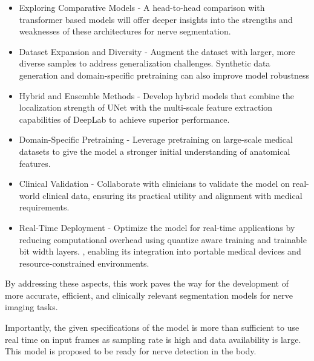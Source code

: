 \documentclass{article}
\begin{document}
\begin{itemize}
    \item Exploring Comparative Models - 
	A head-to-head comparison with transformer based models will offer deeper insights into the strengths and weaknesses of these architectures for nerve segmentation.
    \item Dataset Expansion and Diversity - Augment the dataset with larger, more diverse samples to address generalization challenges. Synthetic data generation and domain-specific pretraining can also improve model robustness
    \item Hybrid and Ensemble Methods - Develop hybrid models that combine the localization strength of UNet with the multi-scale feature extraction capabilities of DeepLab to achieve superior performance.
    \item Domain-Specific Pretraining - Leverage pretraining on large-scale medical datasets to give the model a stronger initial understanding of anatomical features.
    \item Clinical Validation - Collaborate with clinicians to validate the model on real-world clinical data, ensuring its practical utility and alignment with medical requirements.
    \item Real-Time Deployment - Optimize the model for real-time applications by reducing computational overhead using quantize aware training and trainable bit width layers. \cite{boerkamp2025quantunetefficientwearablemedical}, enabling its integration into portable medical devices and resource-constrained environments.
\end{itemize}

By addressing these aspects, this work paves the way for the development of more accurate, efficient, and clinically relevant segmentation models for nerve imaging tasks.

Importantly, the given specifications of the model is more than sufficient to use real time on input frames as sampling rate is high and data availability is large. This model is proposed to be ready for nerve detection in the body.



%
\end{document}
